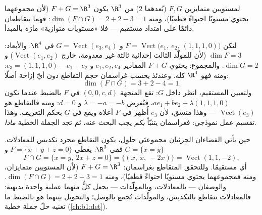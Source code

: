 \begin{example}\label{ex:b1:findim:planes}
لمستويين متمايزين $F, G$ (بُعدهما $2$) من $\R^3$ يكون $F + G
= \R^3$ (لأن مجموعهما يحتوي مستويًا احتواءً قطعيًا)، ومنه $\dim(F \cap G) =
2 + 2 - 3 = 1$: فهما يتقاطعان دائمًا على امتداد مستقيم --- فلا
«مستويات متوازية» مارّة بالمبدأ.
\end{example}

\begin{example}
\label{ex:b1:findim:grassmannrun}
لتكن $F = \operatorname{Vect}\bigl(e_1,\ e_2,\ (1,1,1,0)\bigr)$
و $G = \operatorname{Vect}(e_3, e_4)$ في $\R^4$. والأبعاد:
$\dim F = 3$ (لأن للمولّد الثالث إحداثية ثالثة غير معدومة،
خارج $\operatorname{Vect}(e_1, e_2)$) و $\dim G = 2$. والمجموع:
يحتوي $F + G$ المقادير $e_1, e_2, e_4$ و $e_3 = (1,1,1,0) - e_1 -
e_2$: ومنه فهو $\R^4$ كله. وعندئذ \emph{يحسب} غراسمان
حجم التقاطع دون أيّ إزاحة أصلًا:
\[
\dim(F \cap G) = 3 + 2 - 4 = 1 .
\]
ولتعيين المستقيم، انظر داخل $G$: تقع المتجهة $(0, 0, c, d)$
في $F$ بالضبط عندما تكون $a e_1 + b e_2 + \lambda(1,1,1,0)$،
فيُفرض $\lambda = -a = -b$ و $d = 0$: ومنه فالتقاطع هو
$\operatorname{Vect}(e_3)$ --- وهذا متسق، لأن $e_3$ أُظهر
في $F$ أعلاه ويقع في $G$ بحكم التعريف. وهذا تقسيم عمل
نموذجي: فغراسمان يتنبّأ \emph{بكم} يجب البحث عنه،
ثم تجد الجملة الخطية \emph{ماذا}.
\end{example}

\begin{example}
\label{ex:b1:findim:intersectequations}
حين يأتي الفضاءان الجزئيان مجموعتَي حلول، يكون التقاطع مجرد
تكديس للمعادلات. ففي $\R^3$: يعطي $F = \{x + y + z = 0\}$ و
$G = \{x = y\}$
\[
F \cap G = \{x = y,\ 2x + z = 0\}
= \{(x,\ x,\ -2x)\} = \operatorname{Vect}(1, 1, -2),
\]
أي مستقيمًا. وللتحقق المتقاطع بغراسمان: $F + G = \R^3$ (لأن المستويين
متمايزان، ومنه فمجموعهما يحتوي مستويًا احتواءً قطعيًا)، ومنه
$\dim(F\cap G) = 2 + 2 - 3 = 1$. والوصفان  --- بالمعادلات، وبالمولّدات --- يجعل كلٌّ منهما عملية
واحدة بديهية: فالمعادلات تتقاطع بالتكديس، والمولّدات
تُجمع بالوصل؛ والتحويل بينهما هو بالضبط ما تعنيه
حلّ جملة خطية (\cref{ch:b1:det}).
\end{example}

